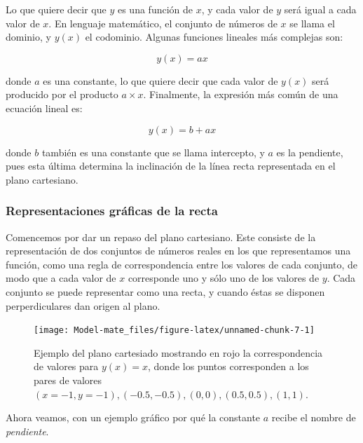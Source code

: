 \documentclass[
]{book}
\begin{document}
Lo que quiere decir que \(y\) es una función de \(x\), y cada valor de \(y\) será igual a cada valor de \(x\). En lenguaje matemático, el conjunto de números de \(x\) se llama el dominio, y \(y(x)\) el codominio. Algunas funciones lineales más complejas son:

\begin{equation}
    y(x) = ax
\end{equation}

donde \(a\) es una constante, lo que quiere decir que cada valor de \(y(x)\) será producido por el producto \(a \times x\). Finalmente, la expresión más común de una ecuación lineal es:

\begin{equation}
    y(x) = b + ax
\end{equation}

donde \(b\) también es una constante que se llama intercepto, y \(a\) es la pendiente, pues esta última determina la inclinación de la línea recta representada en el plano cartesiano.

\hypertarget{representaciones-gruxe1ficas-de-la-recta}{%
\subsubsection{Representaciones gráficas de la recta}\label{representaciones-gruxe1ficas-de-la-recta}}

Comencemos por dar un repaso del plano cartesiano. Este consiste de la representación de dos conjuntos de números reales en los que representamos una función, como una regla de correspondencia entre los valores de cada conjunto, de modo que a cada valor de \(x\) corresponde uno y sólo uno de los valores de \(y\). Cada conjunto se puede representar como una recta, y cuando éstas se disponen perperdiculares dan origen al plano.

\begin{figure}

{\centering \texttt{[image: Model-mate\_files/figure-latex/unnamed-chunk-7-1]} 

}

\caption{Ejemplo del plano cartesiado mostrando en rojo la correspondencia de valores para $y(x) = x$, donde los puntos corresponden a los pares de valores $(x = -1, y = -1), (-0.5, -0.5), (0, 0), (0.5, 0.5), (1, 1)$.}\label{fig:unnamed-chunk-7}
\end{figure}

Ahora veamos, con un ejemplo gráfico por qué la constante \(a\) recibe el nombre de \emph{pendiente}.
\end{document}
